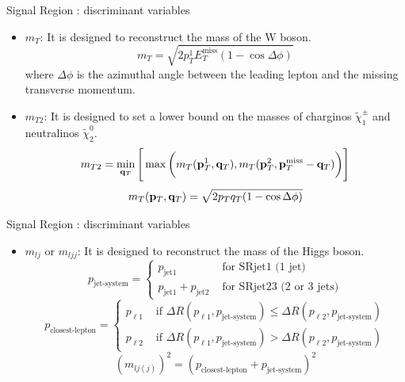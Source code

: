 \documentclass[mathserif,serif]{beamer}
\begin{document}
\begin{frame}{Signal Region : discriminant variables}
\begin{itemize}
\item $m_T$: It is designed to reconstruct the mass of the W boson.
\begin{equation*}
m_T = \sqrt{ 2 p_T^1 E_T^{\text{miss}} ( 1 - \cos{\Delta\phi} ) }
\end{equation*}
where $\Delta\phi$ is the azimuthal angle between the leading lepton and the missing transverse momentum.
\item $m_{T2}$: It is designed to set a lower bound on the masses of charginos $\tilde{\chi}_1^\pm$ and neutralinos $\tilde{\chi}_2^0$.
\begin{equation*}
m_{T2} = \min_{{\bf q}_T} \Bigg[ \max \bigg( m_T( {\bf p}_T^1, {\bf q}_T ), m_T( {\bf p}_T^2, {\bf p}_T^{\text{miss}} - {\bf q}_T ) \bigg) \Bigg]
\end{equation*}
\begin{equation*}
m_T( {\bf p}_T, {\bf q}_T ) = \sqrt{ 2 p_T q_T ( 1 - \cos{\Delta\phi} ) }
\end{equation*}
\end{itemize}
\end{frame}

\begin{frame}{Signal Region : discriminant variables}
\begin{itemize}
\item $m_{lj}$ or $m_{ljj}$: It is designed to reconstruct the mass of the Higgs boson.
\begin{equation*}
p_{\text{jet-system}} =
\left\{
\begin{array}{ll}
p_{\text{jet1}} &\text{ for SRjet1 (1 jet)}\\
p_{\text{jet1}} + p_{\text{jet2}} &\text{ for SRjet23 (2 or 3 jets)}
\end{array} \right.
\end{equation*}
\begin{equation*}
p_{\text{closest-lepton}} =
\left\{
\begin{array}{ll}
p_{\ell 1} &\text{ if } \Delta R(p_{\ell 1},p_{\text{jet-system}}) \leq \Delta R(p_{\ell 2},p_{\text{jet-system}}) \\
p_{\ell 2} &\text{ if } \Delta R(p_{\ell 1},p_{\text{jet-system}}) > \Delta R(p_{\ell 2},p_{\text{jet-system}})
\end{array} \right.
\end{equation*}
\begin{equation*}
(m_{lj(j)})^2 = (p_{\text{closest-lepton}} + p_{\text{jet-system}})^2
\end{equation*}
\end{itemize}
\end{frame}
\end{document}
